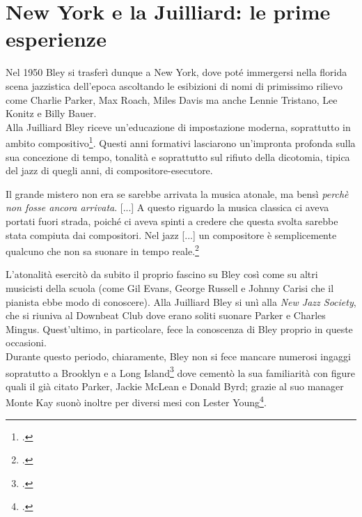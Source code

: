 \section{New York e la Juilliard: le prime esperienze}
Nel 1950 Bley si trasferì dunque a New York, dove poté immergersi nella florida scena jazzistica dell'epoca ascoltando le esibizioni di nomi di primissimo rilievo come Charlie Parker, Max Roach, Miles Davis ma anche Lennie Tristano, Lee Konitz e Billy Bauer.\\
Alla Juilliard Bley riceve un'educazione di impostazione moderna, soprattutto in ambito compositivo\footcite[23]{stopping}. Questi anni formativi lasciarono un'impronta profonda sulla sua concezione di tempo, tonalità e soprattutto sul rifiuto della dicotomia, tipica del jazz di quegli anni, di compositore-esecutore.
\begin{fquote}
	Il grande mistero non era se sarebbe arrivata la musica atonale, ma bensì \textit{perchè non fosse ancora arrivata}. [...] A questo riguardo la musica classica ci aveva portati fuori strada, poiché ci aveva spinti a credere che questa svolta sarebbe stata compiuta dai compositori. Nel jazz [...] un compositore è semplicemente qualcuno che non sa suonare in tempo reale.\footcite[24]{stopping}
\end{fquote}
L'atonalità esercitò da subito il proprio fascino su Bley così come su altri musicisti della scuola (come Gil Evans, George Russell e Johnny Carisi che il pianista ebbe modo di conoscere). Alla Juilliard Bley si unì alla \textit{New Jazz Society}, che si riuniva al Downbeat Club dove erano soliti suonare Parker e Charles Mingus. Quest'ultimo, in particolare, fece la conoscenza di Bley proprio in queste occasioni.\\
Durante questo periodo, chiaramente, Bley non si fece mancare numerosi ingaggi sopratutto a Brooklyn e a Long Island\footcite[47]{cappelletti} dove cementò la sua familiarità con figure quali il già citato Parker, Jackie McLean e Donald Byrd; grazie al suo manager Monte Kay suonò inoltre per diversi mesi con Lester Young\footcite[47]{cappelletti}.\par
